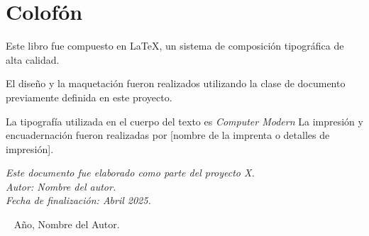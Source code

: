 \chapter*{Colofón} %

Este libro fue compuesto en \LaTeX, un sistema de composición tipográfica de alta calidad.

El diseño y la maquetación fueron realizados utilizando la clase de documento previamente definida en este proyecto.

La tipografía utilizada en el cuerpo del texto es \textit{Computer Modern}
La impresión y encuadernación fueron realizadas por [nombre de la imprenta o detalles de impresión].

\vfill

\begin{center}
  \small
  \textit{Este documento fue elaborado como parte del proyecto X.} \\
  \textit{Autor: Nombre del autor.} \\
  \textit{Fecha de finalización: Abril 2025.}
  
  \vspace{1em}

  \textcopyright~
  Año, Nombre del Autor.
\end{center}
